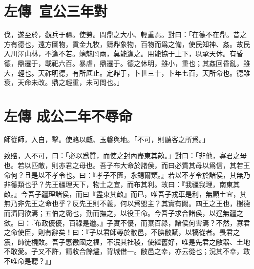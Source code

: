 \section[王孫滿對楚子\quad{\small 左傳\ 宣公三年}]{{\normalsize 左傳\ 宣公三年}\quad {}對}
伐，遂至於，觀兵于疆。使勞。問鼎之大小、輕重焉。對曰：「在德不在鼎。昔之方有德也，遠方圖物，貢金九牧，鑄鼎象物，百物而爲之備，使民知神、姦。故民入川澤山林，不逢不若。螭魅罔兩，莫能逢之。用能協于上下，以承天休。有昏德，鼎遷于，載祀六百。暴虐，鼎遷于。德之休明，雖小，重也；其姦回昏亂，雖大，輕也。天祚明德，有所厎止。定鼎于，卜世三十，卜年七百，天所命也。德雖衰，天命未改。鼎之輕重，未可問也。」

\theendnotes 

\section[齊國佐不辱命\quad{\small 左傳 成公二年}]{{\normalsize 左傳 成公二年}\quad {}不辱命}
師從師，入自，擊。使賂以甗、玉磬與地。「不可，則聽客之所爲。」

致賂，人不可，曰：「必以爲質，而使之封內盡東其畝。」對曰：「非他，寡君之母也。若以匹敵，則亦君之母也。吾子布大命於諸侯，而曰必質其母以爲信，其若王命何？且是以不孝令也。曰：『孝子不匱，永錫爾類。』若以不孝令於諸侯，其無乃非德類也乎？先王疆理天下，物土之宜，而布其利。故曰：『我疆我理，南東其畝。』今吾子疆理諸侯，而曰『盡東其畝』而已，唯吾子戎車是利，無顧土宜，其無乃非先王之命也乎？反先王則不義，何以爲盟主？其實有闕。四王之王也，樹德而濟同欲焉；五伯之霸也，勤而撫之，以役王命。今吾子求合諸侯，以逞無疆之欲。曰：『布政優優，百祿是遒。』子實不優，而棄百祿，諸侯何害焉？不然，寡君之命使臣，則有辭矣！曰：『子以君師辱於敝邑，不腆敝賦，以犒從者。畏君之震，師徒橈敗。吾子惠徼國之福，不泯其社稷，使繼舊好，唯是先君之敝器、土地不敢愛。子又不許，請收合餘燼，背城借一。敝邑之幸，亦云從也；況其不幸，敢不唯命是聽？』」

